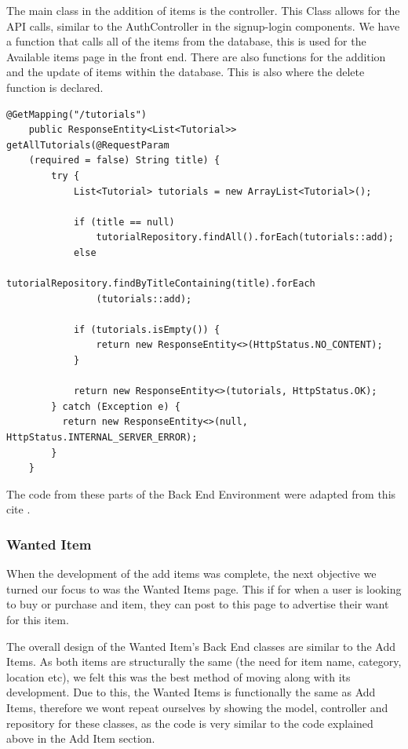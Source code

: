 The main class in the addition of items is the controller. This Class allows for the API calls, similar to the AuthController in the signup-login components. We have a function that calls all of the items from the database, this is used for the Available items page in the front end. There are also functions for the addition and the update of items within the database. This is also where the delete function is declared.
\begin{verbatim}
@GetMapping("/tutorials")
    public ResponseEntity<List<Tutorial>> getAllTutorials(@RequestParam
    (required = false) String title) {
        try {
            List<Tutorial> tutorials = new ArrayList<Tutorial>();

            if (title == null)
                tutorialRepository.findAll().forEach(tutorials::add);
            else
                tutorialRepository.findByTitleContaining(title).forEach
                (tutorials::add);

            if (tutorials.isEmpty()) {
                return new ResponseEntity<>(HttpStatus.NO_CONTENT);
            }

            return new ResponseEntity<>(tutorials, HttpStatus.OK);
        } catch (Exception e) {
          return new ResponseEntity<>(null, HttpStatus.INTERNAL_SERVER_ERROR);
        }
    }
\end{verbatim}
The code from these parts of the Back End Environment were adapted from this cite \cite{zKoder}.

\subsubsection{Wanted Item}
When the development of the add items was complete, the next objective we turned our focus to was the Wanted Items page. This if for when a user is looking to buy or purchase and item, they can post to this page to advertise their want for this item. \par
The overall design of the Wanted Item's Back End classes are similar to the Add Items. As both items are structurally the same (the need for item name, category, location etc), we felt this was the best method of moving along with its development. Due to this, the Wanted Items is functionally the same as Add Items, therefore we wont repeat ourselves by showing the model, controller and repository for these classes, as the code is very similar to the code explained above in the Add Item section. \par 

